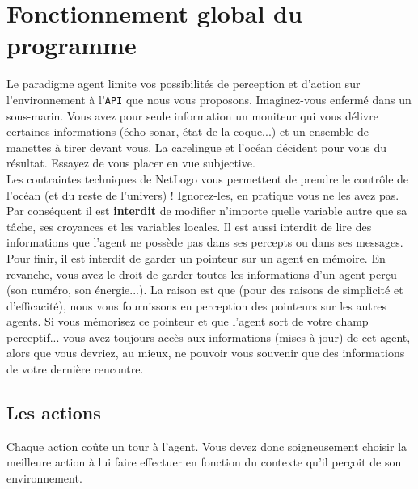 \documentclass[a4paper,11pt]{article}
\begin{document}
\section*{Fonctionnement global du programme}

Le paradigme agent limite vos possibilités de perception et d'action sur l'environnement à
l'\texttt{API} que nous vous proposons. Imaginez-vous enfermé dans un sous-marin. Vous avez pour
seule information un moniteur qui vous délivre certaines informations (écho sonar, état de la
coque...) et un ensemble de manettes à tirer devant vous. La carelingue et l'océan décident pour
vous du résultat. Essayez de vous placer en vue subjective.\\

Les contraintes techniques de NetLogo vous permettent de prendre le contrôle de l'océan (et du reste
de l'univers) ! Ignorez-les, en pratique vous ne les avez pas. Par conséquent il est
\textbf{interdit} de modifier n'importe quelle variable autre que sa tâche, ses croyances et les
variables locales. Il est aussi interdit de lire des informations que l'agent ne possède pas dans
ses percepts ou dans ses messages.\\

Pour finir, il est interdit de garder un pointeur sur un agent en mémoire. En revanche, vous avez le
droit de garder toutes les informations d'un agent perçu (son numéro, son énergie...). La raison est
que (pour des raisons de simplicité et d'efficacité), nous vous fournissons en perception des
pointeurs sur les autres agents. Si vous mémorisez ce pointeur et que l'agent sort de votre champ
perceptif... vous avez toujours accès aux informations (mises à jour) de cet agent, alors que vous
devriez, au mieux, ne pouvoir vous souvenir que des informations de votre dernière rencontre.

\subsection*{Les actions}

Chaque action coûte un tour à l'agent. Vous devez donc soigneusement choisir la meilleure action à lui
faire effectuer en fonction du contexte qu'il perçoit de son environnement.
\end{document}
